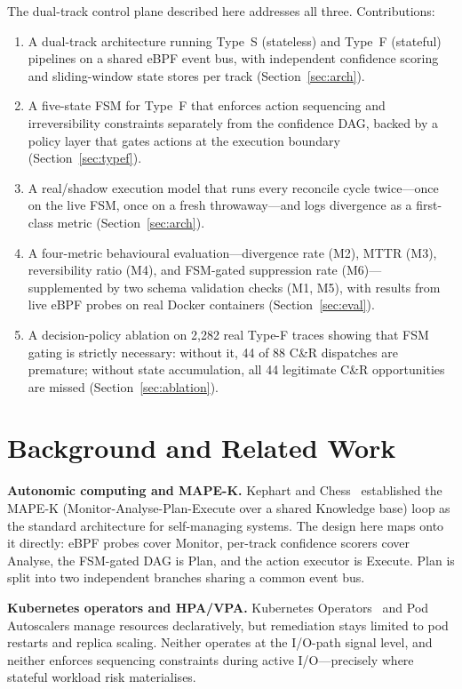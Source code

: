 \documentclass[conference]{IEEEtran}
\begin{document}
The dual-track control plane described here addresses all three. Contributions:
\begin{enumerate}
\item A dual-track architecture running Type~S (stateless) and Type~F (stateful) pipelines on a shared eBPF event bus, with independent confidence scoring and sliding-window state stores per track (Section~\ref{sec:arch}).
\item A five-state FSM for Type~F that enforces action sequencing and irreversibility constraints separately from the confidence DAG, backed by a policy layer that gates actions at the execution boundary (Section~\ref{sec:typef}).
\item A real/shadow execution model that runs every reconcile cycle twice---once on the live FSM, once on a fresh throwaway---and logs divergence as a first-class metric (Section~\ref{sec:arch}).
\item A four-metric behavioural evaluation---divergence rate (M2), MTTR (M3), reversibility ratio (M4), and FSM-gated suppression rate (M6)---supplemented by two schema validation checks (M1, M5), with results from live eBPF probes on real Docker containers (Section~\ref{sec:eval}).
\item A decision-policy ablation on 2,282 real Type-F traces showing that FSM gating is strictly necessary: without it, 44 of 88 C\&R dispatches are premature; without state accumulation, all 44 legitimate C\&R opportunities are missed (Section~\ref{sec:ablation}).
\end{enumerate}

\section{Background and Related Work}
\label{sec:background}

\textbf{Autonomic computing and MAPE-K.} Kephart and Chess~\cite{b8} established the MAPE-K (Monitor-Analyse-Plan-Execute over a shared Knowledge base) loop as the standard architecture for self-managing systems. The design here maps onto it directly: eBPF probes cover Monitor, per-track confidence scorers cover Analyse, the FSM-gated DAG is Plan, and the action executor is Execute. Plan is split into two independent branches sharing a common event bus.

\textbf{Kubernetes operators and HPA/VPA.} Kubernetes Operators~\cite{b1} and Pod Autoscalers manage resources declaratively, but remediation stays limited to pod restarts and replica scaling. Neither operates at the I/O-path signal level, and neither enforces sequencing constraints during active I/O---precisely where stateful workload risk materialises.
\end{document}

